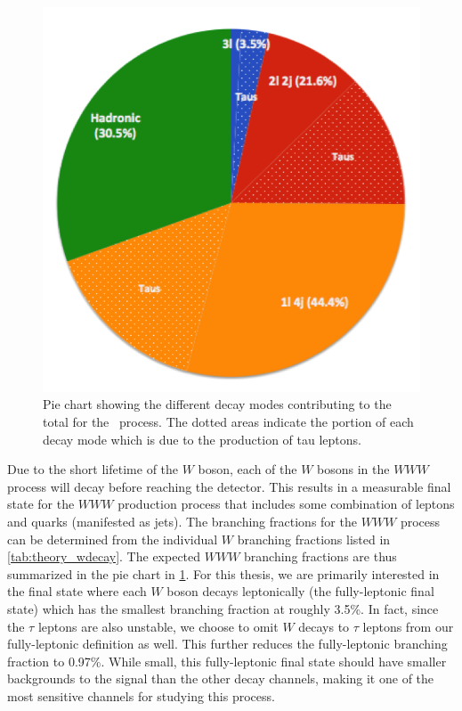 \begin{figure}
\centering
\includegraphics[scale=.8]{figures/branching_fractions.png}
\caption{Pie chart showing the different decay modes contributing 
to the total \xsec for the \www~process. 
The dotted areas indicate the portion of each decay 
mode which is due to the production of tau leptons.}
\label{fig:branching_fractions}
\end{figure}

Due to the short lifetime of the $W$ boson, each of the $W$ bosons
in the $WWW$ process will decay before reaching the detector.
This results in a measurable final state for the $WWW$ production 
process that includes some combination of leptons 
and quarks (manifested as jets).  The branching fractions for 
the $WWW$ process can be determined from the individual $W$ branching fractions
listed in \tab\ref{tab:theory_wdecay}.  The expected $WWW$ branching
fractions are thus summarized in the pie chart in \fig\ref{fig:branching_fractions}.
For this thesis, we are primarily interested in the final state
where each $W$ boson decays leptonically (the fully-leptonic final state) 
which has the smallest branching fraction at roughly 3.5\%.
In fact, since the $\tau$ leptons are also unstable, we choose to 
omit $W$ decays to $\tau$ leptons from our fully-leptonic
definition as well. This further reduces the fully-leptonic 
branching fraction to 0.97\%.  While small, this fully-leptonic final state
should have smaller backgrounds to the signal than the other 
decay channels, making it one of the most sensitive channels for studying
this process.


